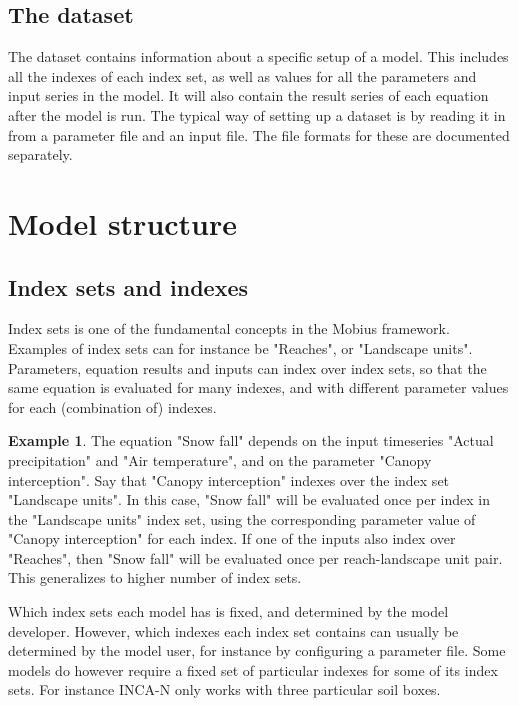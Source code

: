 \documentclass[11pt]{article}
\theoremstyle{definition}
\newtheorem{myexample}{Example}
\newenvironment{example}%
  {\begin{lrbox}{\examplebox}%
   \begin{minipage}{\dimexpr\linewidth-2\fboxsep}
   \begin{myexample}}%
  {\end{myexample}%
   \end{minipage}%
   \end{lrbox}%
   \begin{trivlist}
     \item[]\colorbox{silver}{\usebox\examplebox}
   \end{trivlist}}
\begin{document}
\subsection{The dataset}

The dataset contains information about a specific setup of a model. This includes all the indexes of each index set, as well as values for all the parameters and input series in the model. It will also contain the result series of each equation after the model is run. The typical way of setting up a dataset is by reading it in from a parameter file and an input file. The file formats for these are documented separately.

\section{Model structure}

\subsection{Index sets and indexes}

Index sets is one of the fundamental concepts in the Mobius framework. Examples of index sets can for instance be "Reaches", or "Landscape units". Parameters, equation results and inputs can index over index sets, so that the same equation is evaluated for many indexes, and with different parameter values for each (combination of) indexes.

\begin{example}
The equation "Snow fall" depends on the input timeseries "Actual precipitation" and "Air temperature", and on the parameter "Canopy interception". Say that "Canopy interception" indexes over the index set "Landscape units". In this case, "Snow fall" will be evaluated once per index in the "Landscape units" index set, using the corresponding parameter value of "Canopy interception" for each index. If one of the inputs also index over "Reaches", then "Snow fall" will be evaluated once per reach-landscape unit pair. This generalizes to higher number of index sets.
\end{example}

Which index sets each model has is fixed, and determined by the model developer. However, which indexes each index set contains can usually be determined by the model user, for instance by configuring a parameter file. Some models do however require a fixed set of particular indexes for some of its index sets. For instance INCA-N only works with three particular soil boxes.
\end{document}
